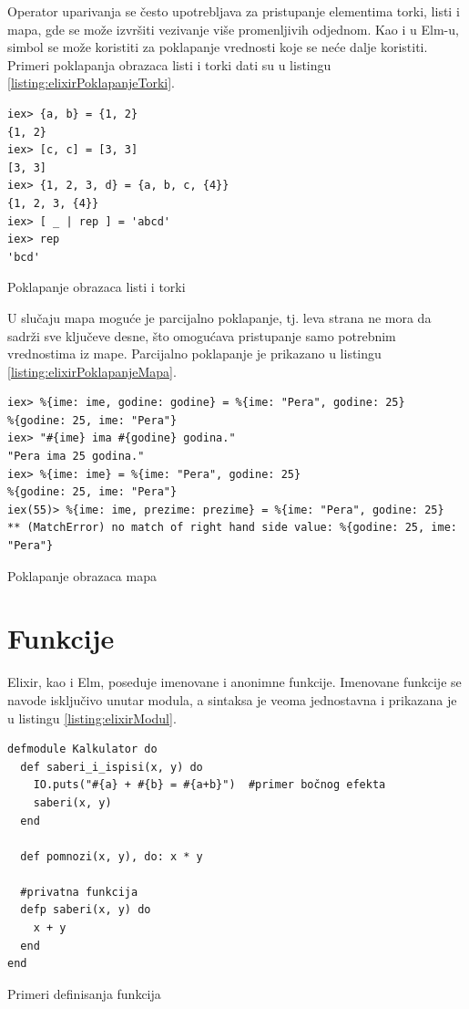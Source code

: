 \documentclass[12pt,oneside]{memoir}
\begin{document}
Operator uparivanja se često upotrebljava za pristupanje elementima torki, listi i mapa,
gde se može izvršiti vezivanje više promenljivih odjednom. Kao i u Elm-u, simbol 
\texttt{\textbf{\textunderscore}} se može koristiti za poklapanje vrednosti koje se neće
dalje koristiti. Primeri poklapanja obrazaca listi i torki dati su u listingu
\ref{listing:elixirPoklapanjeTorki}.
\begin{listing}[!h]
\begin{verbatim}
iex> {a, b} = {1, 2}
{1, 2}
iex> [c, c] = [3, 3]
[3, 3]
iex> {1, 2, 3, d} = {a, b, c, {4}}
{1, 2, 3, {4}}
iex> [ _ | rep ] = 'abcd'
iex> rep
'bcd'
\end{verbatim}
\caption{Poklapanje obrazaca listi i torki}
\label{listing:elixirPoklapanjeTorki}
\end{listing}

U slučaju mapa moguće je parcijalno poklapanje, tj. leva strana ne mora da sadrži sve
ključeve desne, što omogućava pristupanje samo potrebnim vrednostima iz mape. Parcijalno
poklapanje je prikazano u listingu \ref{listing:elixirPoklapanjeMapa}.
\begin{listing}[!h]
\begin{verbatim}
iex> %{ime: ime, godine: godine} = %{ime: "Pera", godine: 25}
%{godine: 25, ime: "Pera"}
iex> "#{ime} ima #{godine} godina."
"Pera ima 25 godina."
iex> %{ime: ime} = %{ime: "Pera", godine: 25}
%{godine: 25, ime: "Pera"}
iex(55)> %{ime: ime, prezime: prezime} = %{ime: "Pera", godine: 25}
** (MatchError) no match of right hand side value: %{godine: 25, ime: "Pera"}
\end{verbatim}
\caption{Poklapanje obrazaca mapa}
\label{listing:elixirPoklapanjeMapa}
\end{listing}

\section{Funkcije}
Elixir, kao i Elm, poseduje imenovane i anonimne funkcije. Imenovane funkcije se navode
isključivo unutar modula, a sintaksa je veoma jednostavna i prikazana je u listingu
\ref{listing:elixirModul}.
\begin{listing}[!h]
\begin{verbatim}
defmodule Kalkulator do
  def saberi_i_ispisi(x, y) do
    IO.puts("#{a} + #{b} = #{a+b}")  #primer bočnog efekta
    saberi(x, y)
  end

  def pomnozi(x, y), do: x * y

  #privatna funkcija
  defp saberi(x, y) do 
    x + y
  end
end
\end{verbatim}
\caption{Primeri definisanja funkcija}
\label{listing:elixirModul}
\end{listing}
\end{document}
